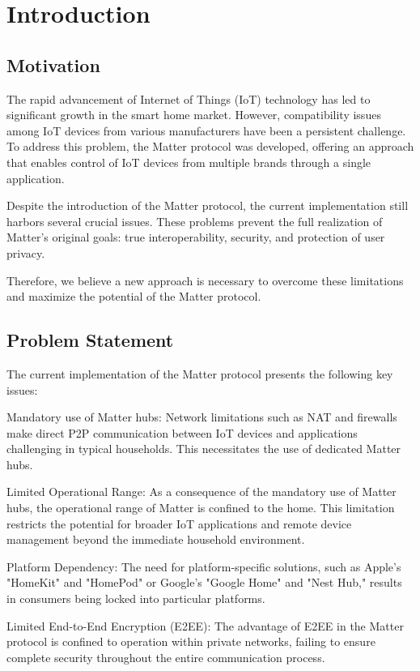 \documentclass[conference]{IEEEtran}
\begin{document}
\section{Introduction}

\subsection{Motivation}
The rapid advancement of Internet of Things (IoT) technology has led to significant growth in the smart home market. However, compatibility issues among IoT devices from various manufacturers have been a persistent challenge. To address this problem, the Matter protocol was developed, offering an approach that enables control of IoT devices from multiple brands through a single application.

Despite the introduction of the Matter protocol, the current implementation still harbors several crucial issues. These problems prevent the full realization of Matter's original goals: true interoperability, security, and protection of user privacy. 


Therefore, we believe a new approach is necessary to overcome these limitations and maximize the potential of the Matter protocol.

\subsection{Problem Statement}
The current implementation of the Matter protocol presents the following key issues:

Mandatory use of  Matter hubs: Network limitations such as NAT and firewalls make direct P2P communication between IoT devices and applications challenging in typical households. This necessitates the use of dedicated Matter hubs.

Limited Operational Range: As a consequence of the mandatory use of Matter hubs, the operational range of Matter is confined to the home. This limitation restricts the potential for broader IoT applications and remote device management beyond the immediate household environment.

Platform Dependency: The need for platform-specific solutions, such as Apple's "HomeKit" and "HomePod" or Google's "Google Home" and "Nest Hub," results in consumers being locked into particular platforms.

Limited End-to-End Encryption (E2EE): The advantage of E2EE in the Matter protocol is confined to operation within private networks, failing to ensure complete security throughout the entire communication process.
\end{document}
